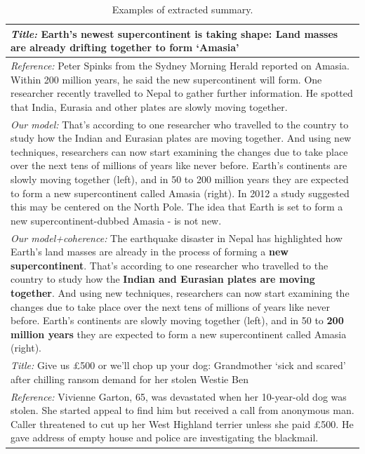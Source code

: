 \documentclass[letterpaper]{article} %
\begin{document}
	
	\begin{table}[ht]
		\centering
		\caption{Examples of extracted summary.}
		\label{tab:coherence_examples}
		
		\begin{tabular}{|p{80mm}|}
			\hline
			\small{\textit{Title:} Earth's newest supercontinent is taking shape: Land masses are already drifting together to form `Amasia'}
			\\\hline
			\small{\textit{Reference:} Peter Spinks from the Sydney Morning Herald reported on Amasia. Within 200 million years, he said the new supercontinent will form. One researcher recently travelled to Nepal to gather further information. He spotted that India, Eurasia and other plates are slowly moving together.} \\\hline
			
			\small{\textit{Our model:} That's according to one researcher who travelled to the country to study how the Indian and Eurasian plates are moving together. And using new techniques, researchers can now start examining the changes due to take place over the next tens of millions of years like never before. Earth's continents are slowly moving together (left), and in 50 to 200 million years they are expected to form a new supercontinent called Amasia (right). In 2012 a study suggested this may be centered on the North Pole. The idea that Earth is set to form a new supercontinent-dubbed Amasia - is not new.}\\\hline

			\small{\textit{Our model+coherence:} The earthquake disaster in Nepal has highlighted how Earth's land masses are already in the process of forming a \textbf{new supercontinent}. That's according to one researcher who travelled to the country to study how the \textbf{Indian and Eurasian plates are moving together}. And using new techniques, researchers can now start examining the changes due to take place over the next tens of millions of years like never before. Earth's continents are slowly moving together (left), and in 50 to \textbf{200 million years} they are expected to form a new supercontinent called Amasia (right).} \\
			\hline
			\hline
			
			\small{\textit{Title:} Give us £500 or we'll chop up your dog: Grandmother `sick and scared' after chilling ransom demand for her stolen Westie Ben}
			\\\hline
			\small{\textit{Reference:} Vivienne Garton, 65, was devastated when her 10-year-old dog was stolen. She started appeal to find him but received a call from anonymous man. Caller threatened to cut up her West Highland terrier unless she paid £500. He gave address of empty house and police are investigating the blackmail.} \\\hline
			

\end{tabular}
\end{table}
\end{document}
